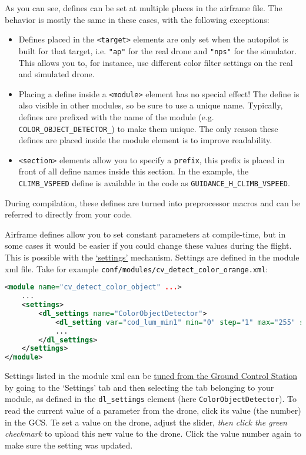 \documentclass{article}
\begin{document}
As you can see, defines can be set at multiple places in the airframe file. The behavior is mostly the same in these cases, with the following exceptions:
\begin{itemize}
\item Defines placed in the \texttt{<target>} elements are only set when the autopilot is built for that target, i.e. \texttt{"ap"} for the real drone and \texttt{"nps"} for the simulator. This allows you to, for instance, use different color filter settings on the real and simulated drone.
\item Placing a define inside a \texttt{<module>} element has no special effect! The define is also visible in other modules, so be sure to use a unique name. Typically, defines are prefixed with the name of the module (e.g. \texttt{COLOR\_OBJECT\_DETECTOR\_}) to make them unique. The only reason these defines are placed inside the module element is to improve readability.
\item \texttt{<section>} elements allow you to specify a \texttt{prefix}, this prefix is placed in front of all define names inside this section. In the example, the \texttt{CLIMB\_VSPEED} define is available in the code as \texttt{GUIDANCE\_H\_CLIMB\_VSPEED}.
\end{itemize}
During compilation, these defines are turned into preprocessor macros and can be referred to directly from your code.


Airframe defines allow you to set constant parameters at compile-time, but in some cases it would be easier if you could change these values during the flight. This is possible with the \href{https://wiki.paparazziuav.org/wiki/Settings}{`settings'} mechanism. Settings are defined in the module xml file. Take for example \texttt{conf/modules/cv\_detect\_color\_orange.xml}:
\begin{lstlisting}[language=xml]
<module name="cv_detect_color_object" ...>
	...
	<settings>
		<dl_settings name="ColorObjectDetector">
			<dl_setting var="cod_lum_min1" min="0" step="1" max="255" shortname="y_min1"/>
			...
		</dl_settings>
	</settings>
</module>
\end{lstlisting}
Settings listed in the module xml can be \href{https://wiki.paparazziuav.org/wiki/GCS#Settings}{tuned from the Ground Control Station} by going to the `Settings' tab and then selecting the tab belonging to your module, as defined in the \texttt{dl\_settings} element (here \texttt{ColorObjectDetector}). To read the current value of a parameter from the drone, click its value (the number) in the GCS. Te set a value on the drone, adjust the slider, \emph{then click the green checkmark} to upload this new value to the drone. Click the value number again to make sure the setting was updated.
\end{document}
